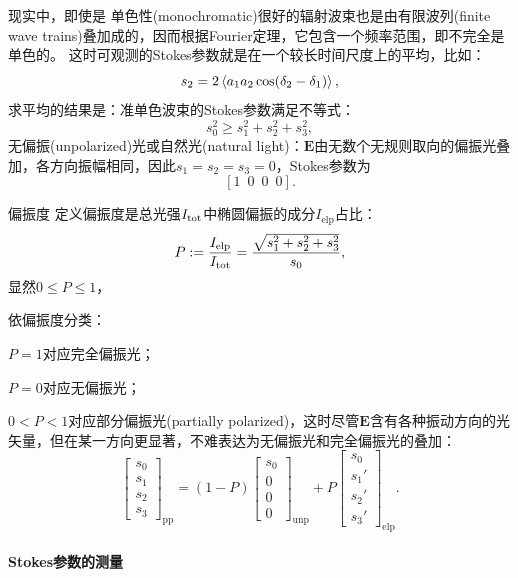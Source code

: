 现实中，即使是%
单色性(monochromatic)很好的辐射波束也是由有限波列(finite wave trains)叠加成的，因而根据Fourier定理，它包含一个频率范围，即不完全是单色的。%
这时可观测的Stokes参数就是在一个较长时间尺度上的平均，比如：
\[
    s_2=2\left\langle a_1a_2\cos(\mathop{}\!\delta_2-\mathop{}\!\delta_1)\right\rangle,
\]
求平均的结果是：准单色波束的Stokes参数满足不等式：
\[
    s_0^2\geqslant s_1^2+s_2^2+s_3^2,
\]
无偏振(unpolarized)光或自然光(natural light)：$\bm E$由无数个无规则取向的偏振光叠加，各方向振幅相同，因此$s_1=s_2=s_3=0$，Stokes参数为
\[
    [1\enspace0\enspace0\enspace0].
\]

\begin{definition}{偏振度}{}
    定义偏振度是总光强$I_\mathrm{tot}$中椭圆偏振的成分$I_\text{elp}$占比：
    \[
        P:=\frac{I_\text{elp}}{I_\mathrm{tot}}=\frac{\sqrt{s_1^2+s_2^2+s_3^2}}{s_0},
    \]
    显然$0\leqslant P\leqslant 1$，
\end{definition}

\begin{corollary}
    依偏振度分类：
    \begin{compactitem}
    	\item $P=1$对应完全偏振光；
    	\item $P=0$对应无偏振光；
    	\item $0<P<1$对应部分偏振光(partially polarized)，这时尽管$\bm E$含有各种振动方向的光矢量，但在某一方向更显著，不难表达为无偏振光和完全偏振光的叠加：
        \[
            \begin{bmatrix}
                s_0\\s_1\\s_2\\s_3
            \end{bmatrix}_\text{pp}=(1-P)
            \begin{bmatrix}
                s_0\\0\\0\\0
            \end{bmatrix}_\text{unp}+P
            \begin{bmatrix}
                s_0\\s_1'\\s_2'\\s_3'
            \end{bmatrix}_\text{elp}.
        \]
    \end{compactitem}
\end{corollary}

\paragraph{Stokes参数的测量}

